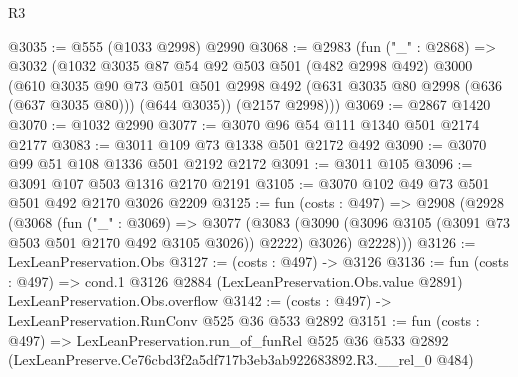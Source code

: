 \begin{lexlean}{R3}
\begin{coremodule}
@3035 := @555 (@1033 @2998) @2990
@3068 := @2983
    (fun ("_" : @2868) =>
    @3032
      (@1032
        @3035
        @87
        @54
        @92
        @503
        @501
        (@482 @2998 @492)
        @3000
        (@610
          @3035
          @90
          @73
          @501
          @501
          @2998
          @492
          (@631 @3035 @80 @2998 (@636 (@637 @3035 @80)))
          (@644 @3035))
        (@2157 @2998)))
@3069 := @2867 @1420
@3070 := @1032 @2990
@3077 := @3070 @96 @54 @111 @1340 @501 @2174 @2177
@3083 := @3011 @109 @73 @1338 @501 @2172 @492
@3090 := @3070 @99 @51 @108 @1336 @501 @2192 @2172
@3091 := @3011 @105
@3096 := @3091 @107 @503 @1316 @2170 @2191
@3105 := @3070 @102 @49 @73 @501 @501 @492 @2170 @3026 @2209
@3125 := fun (costs : @497) =>
  @2908
    (@2928
      (@3068
        (fun ("_" : @3069) =>
        @3077
          (@3083 (@3090 (@3096 @3105 (@3091 @73 @503 @501 @2170 @492 @3105 @3026)) @2222) @3026)
          @2228)))
@3126 := LexLeanPreservation.Obs
@3127 := (costs : @497) -> @3126
@3136 := fun (costs : @497) =>
  cond.{1} @3126 @2884 (LexLeanPreservation.Obs.value @2891) LexLeanPreservation.Obs.overflow
@3142 := (costs : @497) -> LexLeanPreservation.RunConv @525 @36 @533 @2892
@3151 := fun (costs : @497) =>
  LexLeanPreservation.run_of_funRel
    @525
    @36
    @533
    @2892
    (LexLeanPreserve.Ce76cbd3f2a5df717b3eb3ab922683892.R3.__rel_0 @484)
\end{coremodule}
\end{lexlean}
